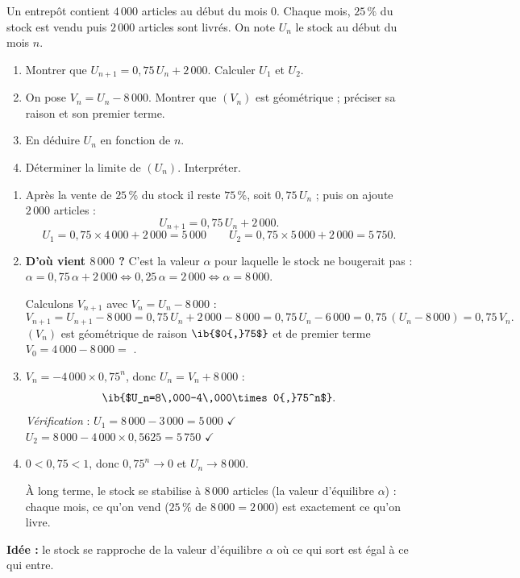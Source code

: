
Un entrepôt contient $4\,000$ articles au début du mois $0$. Chaque mois, $25\,\%$ du stock est vendu puis $2\,000$ articles sont livrés. On note $U_n$ le stock au début du mois $n$.

\begin{enumerate}
  \item Montrer que $U_{n+1}=0{,}75\,U_n+2\,000$. Calculer $U_1$ et $U_2$.
  \item On pose $V_n=U_n-8\,000$. Montrer que $(V_n)$ est géométrique ; préciser sa raison et son premier terme.
  \item En déduire $U_n$ en fonction de $n$.
  \item Déterminer la limite de $(U_n)$. Interpréter.
\end{enumerate}

\begin{enumerate}
  \item Après la vente de $25\,\%$ du stock il reste $75\,\%$, soit $0{,}75\,U_n$ ; puis on ajoute $2\,000$ articles :
  $$U_{n+1}=0{,}75\,U_n+2\,000.$$
  $$U_1=0{,}75\times4\,000+2\,000=5\,000\qquad U_2=0{,}75\times5\,000+2\,000=5\,750.$$
  \item \textbf{D'où vient $8\,000$ ?} C'est la valeur $\alpha$ pour laquelle le stock ne bougerait pas : $\alpha=0{,}75\,\alpha+2\,000\iff0{,}25\,\alpha=2\,000\iff\alpha=8\,000$.

  Calculons $V_{n+1}$ avec $V_n=U_n-8\,000$ :
  $$V_{n+1}=U_{n+1}-8\,000=0{,}75\,U_n+2\,000-8\,000=0{,}75\,U_n-6\,000=0{,}75\,(U_n-8\,000)=0{,}75\,V_n.$$
  $(V_n)$ est géométrique de raison $\ib{$0{,}75$}$ et de premier terme $V_0=4\,000-8\,000=$ .
  \item $V_n=-4\,000\times0{,}75^n$, donc $U_n=V_n+8\,000$ :
  $$ \ib{$U_n=8\,000-4\,000\times0{,}75^n$}.$$
  \emph{Vérification} : $U_1=8\,000-3\,000=5\,000$ $\checkmark$ \quad $U_2=8\,000-4\,000\times0{,}5625=5\,750$ $\checkmark$
  \item $0<0{,}75<1$, donc $0{,}75^n\to0$ et $U_n\to8\,000$.

  À long terme, le stock se stabilise à $8\,000$ articles (la valeur d'équilibre $\alpha$) : chaque mois, ce qu'on vend ($25\,\%$ de $8\,000=2\,000$) est exactement ce qu'on livre.
\end{enumerate}

\textbf{Idée :} le stock se rapproche de la valeur d'équilibre $\alpha$ où ce qui sort est égal à ce qui entre.
